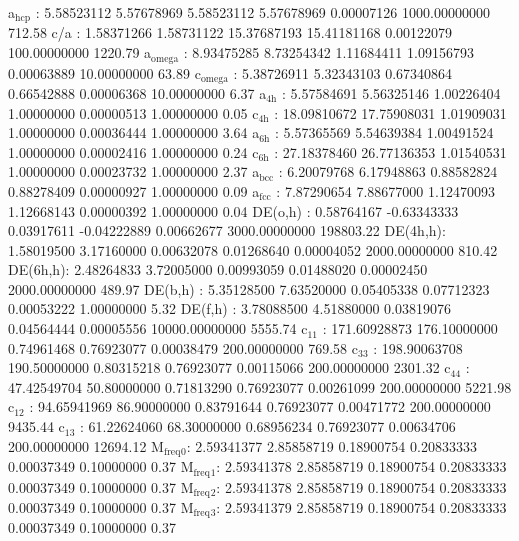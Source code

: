 \documentclass[11pt]{article}
\begin{document}
\begin{enumerate}
a\(_{\text{hcp}}\)   :   5.58523112   5.57678969   5.58523112   5.57678969   0.00007126 1000.00000000       712.58
c/a     :   1.58371266   1.58731122  15.37687193  15.41181168   0.00122079 100.00000000      1220.79
a\(_{\text{omega}}\) :   8.93475285   8.73254342   1.11684411   1.09156793   0.00063889  10.00000000        63.89
c\(_{\text{omega}}\) :   5.38726911   5.32343103   0.67340864   0.66542888   0.00006368  10.00000000         6.37
a\(_{\text{4h}}\)    :   5.57584691   5.56325146   1.00226404   1.00000000   0.00000513   1.00000000         0.05
c\(_{\text{4h}}\)    :  18.09810672  17.75908031   1.01909031   1.00000000   0.00036444   1.00000000         3.64
a\(_{\text{6h}}\)    :   5.57365569   5.54639384   1.00491524   1.00000000   0.00002416   1.00000000         0.24
c\(_{\text{6h}}\)    :  27.18378460  26.77136353   1.01540531   1.00000000   0.00023732   1.00000000         2.37
a\(_{\text{bcc}}\)   :   6.20079768   6.17948863   0.88582824   0.88278409   0.00000927   1.00000000         0.09
a\(_{\text{fcc}}\)   :   7.87290654   7.88677000   1.12470093   1.12668143   0.00000392   1.00000000         0.04
DE(o,h) :   0.58764167  -0.63343333   0.03917611  -0.04222889   0.00662677 3000.00000000    198803.22
DE(4h,h):   1.58019500   3.17160000   0.00632078   0.01268640   0.00004052 2000.00000000       810.42
DE(6h,h):   2.48264833   3.72005000   0.00993059   0.01488020   0.00002450 2000.00000000       489.97
DE(b,h) :   5.35128500   7.63520000   0.05405338   0.07712323   0.00053222   1.00000000         5.32
DE(f,h) :   3.78088500   4.51880000   0.03819076   0.04564444   0.00005556 10000.00000000      5555.74
c\(_{\text{11}}\)    : 171.60928873 176.10000000   0.74961468   0.76923077   0.00038479 200.00000000       769.58
c\(_{\text{33}}\)    : 198.90063708 190.50000000   0.80315218   0.76923077   0.00115066 200.00000000      2301.32
c\(_{\text{44}}\)    :  47.42549704  50.80000000   0.71813290   0.76923077   0.00261099 200.00000000      5221.98
c\(_{\text{12}}\)    :  94.65941969  86.90000000   0.83791644   0.76923077   0.00471772 200.00000000      9435.44
c\(_{\text{13}}\)    :  61.22624060  68.30000000   0.68956234   0.76923077   0.00634706 200.00000000     12694.12
M\(_{\text{freq}}\)\(_{\text{0}}\):   2.59341377   2.85858719   0.18900754   0.20833333   0.00037349   0.10000000         0.37
M\(_{\text{freq}}\)\(_{\text{1}}\):   2.59341378   2.85858719   0.18900754   0.20833333   0.00037349   0.10000000         0.37
M\(_{\text{freq}}\)\(_{\text{2}}\):   2.59341378   2.85858719   0.18900754   0.20833333   0.00037349   0.10000000         0.37
M\(_{\text{freq}}\)\(_{\text{3}}\):   2.59341379   2.85858719   0.18900754   0.20833333   0.00037349   0.10000000         0.37

\end{enumerate}
\end{document}
